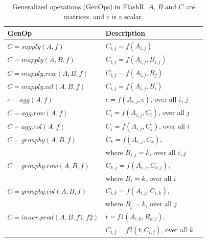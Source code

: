 \begin{table}
\begin{center}
\footnotesize
\begin{tabular}{|l|l|l|}
\hline
GenOp & Description \\
\hline
$C=sapply(A, f)$ & $C_{i,j}=f(A_{i,j})$ \\
\hline
$C=mapply(A, B, f)$ & $C_{i,j}=f(A_{i,j}, B_{i,j})$ \\
\hline
$C=mapply.row(A, B, f)$ & $C_{i,j}=f(A_{i,j}, B_j)$ \\
\hline
$C=mapply.col(A, B, f)$ & $C_{i,j}=f(A_{i,j}, B_i)$ \\
\hline
$c=agg(A, f)$ & $c=f(A_{i,j}, c)$, over all $i$, $j$ \\
\hline
$C=agg.row(A, f)$ & $C_i=f(A_{i,j}, C_i)$, over all $j$ \\
\hline
$C=agg.col(A, f)$ & $C_j=f(A_{i,j}, C_j)$, over all $i$ \\
\hline
$C=groupby(A, B, f)$ & $C_{k}=f(A_{i,j}, C_{k})$,\\ & where $B_{i, j}=k$, over all $i,j$ \\
\hline
$C=groupby.row(A, B, f)$ & $C_{k,j}=f(A_{i,j}, C_{k,j})$,\\ & where $B_i=k$, over all $i$ \\
\hline
$C=groupby.col(A, B, f)$ & $C_{i,k}=f(A_{i,j}, C_{i,k})$,\\ & where $B_j=k$, over all $j$ \\
\hline
$C=inner.prod(A, B, f1, f2)$ & $t=f1(A_{i,k}, B_{k,j})$,
\\ & $C_{i,j}=f2(t, C_{i,j})$, over all $k$ \\
\hline
\end{tabular}
\normalsize
\end{center}
\caption{Generalized operations (GenOps) in FlashR.
$A$, $B$ and $C$ are matrices, and $c$ is a scalar.}
\label{tbl:genops}
\end{table}

